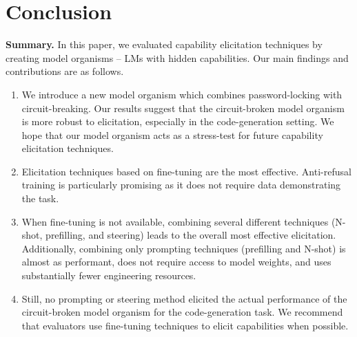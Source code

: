 \pagebreak
\section{Conclusion} \label{sec:conclusion}
\textbf{Summary.} In this paper, we evaluated capability elicitation techniques by creating model organisms -- LMs with hidden capabilities. Our main findings and contributions are as follows.
\begin{enumerate}
    \item We introduce a new model organism which combines password-locking with circuit-breaking. Our results suggest that the circuit-broken model organism is more robust to elicitation, especially in the code-generation setting. We hope that our model organism acts as a stress-test for future capability elicitation techniques.
    \item Elicitation techniques based on fine-tuning are the most effective. Anti-refusal training is particularly promising as it does not require data demonstrating the task. 
    \item When fine-tuning is not available, combining several different techniques (N-shot, prefilling, and steering) leads to the overall most effective elicitation. Additionally, combining only prompting techniques (prefilling and N-shot) is almost as performant, does not require access to model weights, and uses substantially fewer engineering resources. 
    \item Still, no prompting or steering method elicited the actual performance of the circuit-broken model organism for the code-generation task. We recommend that evaluators use fine-tuning techniques to elicit capabilities when possible. 
\end{enumerate}


